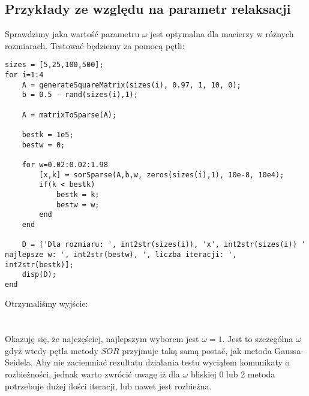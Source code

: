 \documentclass{article}
\begin{document}
\subsection{Przykłady ze względu na parametr relaksacji}
Sprawdzimy jaka wartość parametru $\omega$ jest optymalna dla macierzy w różnych rozmiarach. Testować będziemy za pomocą pętli:
\begin{lstlisting}[style=Matlab-editor]
sizes = [5,25,100,500];
for i=1:4
    A = generateSquareMatrix(sizes(i), 0.97, 1, 10, 0);
    b = 0.5 - rand(sizes(i),1);

    A = matrixToSparse(A);

    bestk = 1e5;
    bestw = 0;

    for w=0.02:0.02:1.98
        [x,k] = sorSparse(A,b,w, zeros(sizes(i),1), 10e-8, 10e4);
        if(k < bestk)
            bestk = k;
            bestw = w;
        end
    end

    D = ['Dla rozmiaru: ', int2str(sizes(i)), 'x', int2str(sizes(i)) ' najlepsze w: ', int2str(bestw), ', liczba iteracji: ', int2str(bestk)];
    disp(D);
end
\end{lstlisting}
Otrzymaliśmy wyjście:\\
\noindent{}\\\\
Okazuję się, że najczęściej, najlepszym wyborem jest $\omega = 1$. Jest to szczególna $\omega$ gdyż wtedy pętla metody $SOR$ przyjmuje taką samą postać, jak metoda Gaussa-Seidela. Aby nie zaciemniać rezultatu działania testu wyciąłem komunikaty o rozbieżności, jednak warto zwrócić uwagę iż dla $\omega$ bliskiej 0 lub 2 metoda potrzebuje dużej ilości iteracji, lub nawet jest rozbieżna.
\end{document}
